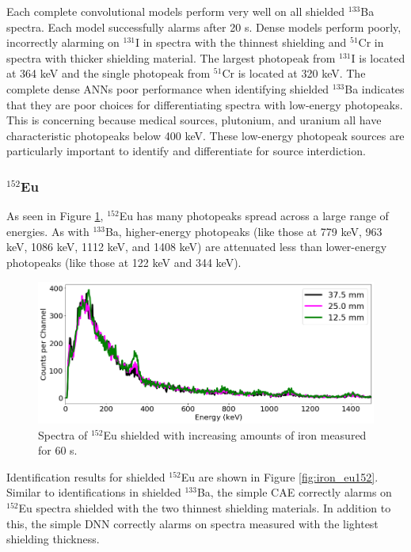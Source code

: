 Each complete convolutional models perform very well on all shielded $^{133}$Ba spectra. Each model successfully alarms after 20 s. Dense models perform poorly, incorrectly alarming on $^{131}$I in spectra with the thinnest shielding and $^{51}$Cr in spectra with thicker shielding material. The largest photopeak from $^{131}$I is located at 364 keV and the single photopeak from $^{51}$Cr is located at 320 keV. The complete dense ANNs poor performance when identifying shielded $^{133}$Ba indicates that they are poor choices for differentiating spectra with low-energy photopeaks. This is concerning because medical sources, plutonium, and uranium all have characteristic photopeaks below 400 keV. These low-energy photopeak sources are particularly important to identify and differentiate for source interdiction.


\subsubsection{$^{152}$Eu}

As seen in Figure \ref{fig:shielded_eu152}, $^{152}$Eu has many photopeaks spread across a large range of energies. As with $^{133}$Ba, higher-energy photopeaks (like those at 779 keV, 963 keV, 1086 keV, 1112 keV, and 1408 keV) are attenuated less than lower-energy photopeaks (like those at 122 keV and 344 keV).

\begin{figure}[H]
	\centering
	\includegraphics[width=0.8\linewidth]{images/shielded_eu152}
	\caption{Spectra of $^{152}$Eu shielded with increasing amounts of iron measured for 60 s.}
	\label{fig:shielded_eu152}
\end{figure}

Identification results for shielded $^{152}$Eu are shown in Figure \ref{fig:iron_eu152}. Similar to identifications in shielded $^{133}$Ba, the simple CAE correctly alarms on $^{152}$Eu spectra shielded with the two thinnest shielding materials. In addition to this, the simple DNN correctly alarms on spectra measured with the lightest shielding thickness.

